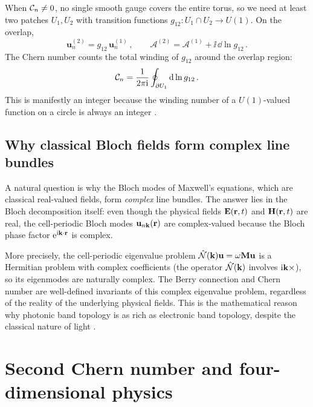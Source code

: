 When $\mathcal{C}_n\neq 0$, no single smooth gauge covers the entire
torus, so we need at least two patches $U_1,U_2$ with transition
functions $g_{12}:U_1\cap U_2\to U(1)$.  On the overlap,
\begin{equation}\label{eq:appB-transition}
  \mathbf{u}_n^{(2)} = g_{12}\,\mathbf{u}_n^{(1)}\,,
  \qquad
  \mathcal{A}^{(2)} = \mathcal{A}^{(1)} + \ii\,\dd\ln g_{12}\,.
\end{equation}
The Chern number counts the total winding of $g_{12}$ around the
overlap region:
\begin{equation}\label{eq:appB-winding-transition}
  \mathcal{C}_n = \frac{1}{2\pi\mathrm{i}}\oint_{\partial U_1}
  \mathrm{d}\ln g_{12}\,.
\end{equation}
This is manifestly an integer because the winding number of a
$U(1)$-valued function on a circle is always an integer
\cite{ozawa2018topological}.

\subsection{Why classical Bloch fields form complex line bundles}
\label{sec:appB-why-complex}

A natural question is why the Bloch modes of Maxwell's equations,
which are classical real-valued fields, form \emph{complex} line
bundles.  The answer lies in the Bloch decomposition itself: even
though the physical fields $\mathbf{E}(\mathbf{r},t)$ and $\mathbf{H}(\mathbf{r},t)$
are real, the cell-periodic Bloch modes $\mathbf{u}_{n\mathbf{k}}(\mathbf{r})$
are complex-valued because the Bloch phase factor
$\mathrm{e}^{\mathrm{i}\mathbf{k}\cdot\mathbf{r}}$ is complex.

More precisely, the cell-periodic eigenvalue problem
$\hat{\mathcal{N}}(\mathbf{k})\mathbf{u}=\omega\mathbf{M}\mathbf{u}$ is a Hermitian
problem with complex coefficients (the operator $\hat{\mathcal{N}}(\mathbf{k})$
involves $\mathrm{i}\mathbf{k}\times$), so its eigenmodes are naturally complex.
The Berry connection and Chern number are well-defined invariants of
this complex eigenvalue problem, regardless of the reality of the
underlying physical fields.  This is the mathematical reason why
photonic band topology is as rich as electronic band topology, despite
the classical nature of light
\cite{gangaraj2016berry,silveirinha2016bulk}.

\section{Second Chern number and four-dimensional physics}
\label{sec:appB-second-chern-detail}

